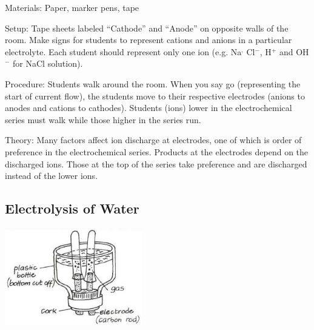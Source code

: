\begin{multicols}{2}
\begin{description*}
\item[Materials:]{Paper, marker pens, tape}
\item[Setup:]{Tape sheets labeled ``Cathode'' and ``Anode'' on opposite walls of the room. Make signs for students to represent cations and anions in a particular electrolyte. Each student should represent only one ion (e.g. Na$^,$ Cl$^-$, H$^+$ and OH$^-$ for NaCl solution). }
\item[Procedure:]{Students walk around the room. When you say go (representing the start of current flow), the students move to their respective electrodes (anions to anodes and cations to cathodes). Students (ions) lower in the electrochemical series must walk while those higher in the series run.}
\item[Theory:]{Many factors affect ion discharge at electrodes, one of which is order of preference in the electrochemical series. Products at the electrodes depend on the discharged ions. Those at the top of the series take preference and are discharged instead of the lower ions.}
\end{description*}

\columnbreak

\subsection{Electrolysis of Water} 

\begin{center}
\includegraphics[width=0.45\textwidth]{./img/vso/electrolysis-nacl.jpg}
\end{center}


\end{multicols}
